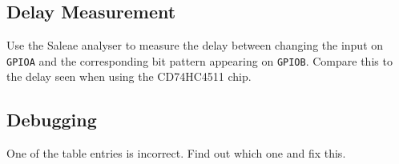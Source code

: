 \documentclass{UoNMCHA}
\numberwithin{equation}{section}
\begin{document}
\subsection{Delay Measurement}

Use the Saleae analyser to measure the delay between changing the input on \texttt{GPIOA} and the corresponding bit pattern appearing on \texttt{GPIOB}. Compare this to the delay seen when using the CD74HC4511 chip.


\subsection{Debugging}
One of the table entries is incorrect. Find out which one and fix this. 
\end{document}
